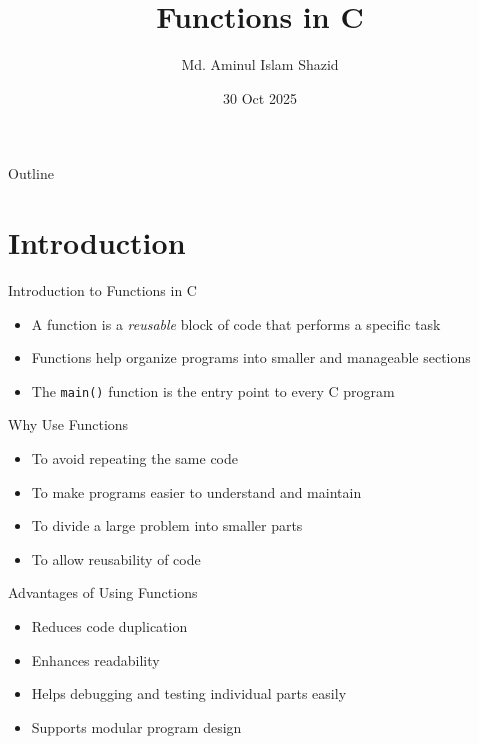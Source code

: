\documentclass[12pt, aspectratio=169]{beamer}
\title{Functions in C}
\author{Md. Aminul Islam Shazid}
\date{30 Oct 2025}
\begin{document}
    {
		\addtocounter{framenumber}{-2}    %

		\begin{frame}
			\titlepage
		\end{frame}

		\begin{frame}{Outline}
            \vfill
            \small
			\tableofcontents[subsectionstyle=hide]
            \vfill
		\end{frame}
	}

    \section{Introduction}

    \begin{frame}{Introduction to Functions in C}
        \begin{itemize}
            \item A function is a \emph{reusable} block of code that performs a specific task
            \item Functions help organize programs into smaller and manageable sections
            \item The \texttt{main()} function is the entry point to every C program
        \end{itemize}
    \end{frame}


    \begin{frame}{Why Use Functions}
        \begin{itemize}
            \item To avoid repeating the same code
            \item To make programs easier to understand and maintain
            \item To divide a large problem into smaller parts
            \item To allow reusability of code
        \end{itemize}
    \end{frame}


    \begin{frame}{Advantages of Using Functions}
        \begin{itemize}
            \item Reduces code duplication
            \item Enhances readability
            \item Helps debugging and testing individual parts easily
            \item Supports modular program design
        \end{itemize}
    \end{frame}
\end{document}

